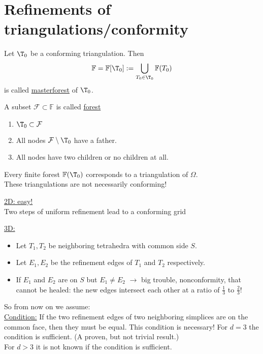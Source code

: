 \chapter{Refinements of triangulations/conformity}

\begin{definition}
	Let $\T_{0}$ be a conforming triangulation. Then 
	\begin{equation*}
		\mathbb{F} = \mathbb{F}[\T_{0}]:= \bigcup_{T_{0} \in \T_{0}} \mathbb{F}(T_{0})
	\end{equation*}
	is called \underline{masterforest} of $\T_{0}$.

	A subset $\mathcal{F} \subset \mathbb{F}$ is called \underline{forest}
  	\begin{enumerate}[label= \arabic*)]
    	\item $\T_{0} \subset \mathcal{F}$ 
    	\item All nodes $\mathcal{F} \setminus \T_{0}$ have a father.
    	\item All nodes have two children or no children at all.
  	\end{enumerate}
	Every finite forest $\mathbb{F}(\T_{0})$ corresponds to a triangulation of $\Omega$.\\
  	These triangulations are not necessarily conforming! 
\end{definition}
\begin{example}
	\underline{2D: easy!} \\
	Two steps of uniform refinement lead to a conforming grid
	
	\underline{3D:}
	\begin{itemize}
		\item Let $T_{1},T_{2}$ be neighboring tetrahedra with common side $S$. 
		\item Let $E_{1},E_{2}$ be the refinement edges of $T_{1}$ and $T_{2}$ respectively.
    \item If $E_{1}$ and $E_{2}$ are on $S$ but $E_{1}\neq E_{2}$ $\to$ big trouble, nonconformity, that cannot be healed: the new edges intersect each other at a ratio of $\frac{1}{3}$ to $\frac{2}{3}$!
	\end{itemize}
	
\end{example}
So from now on we assume:\\
\underline{Condition:} If the two refinement edges of two neighboring simplices are on the common face, then they must be equal. This condition is necessary!\nl
For $d=3$ the condition is sufficient. (A proven, but not trivial result.)\\
For $d>3$ it is not known if the condition is sufficient.

